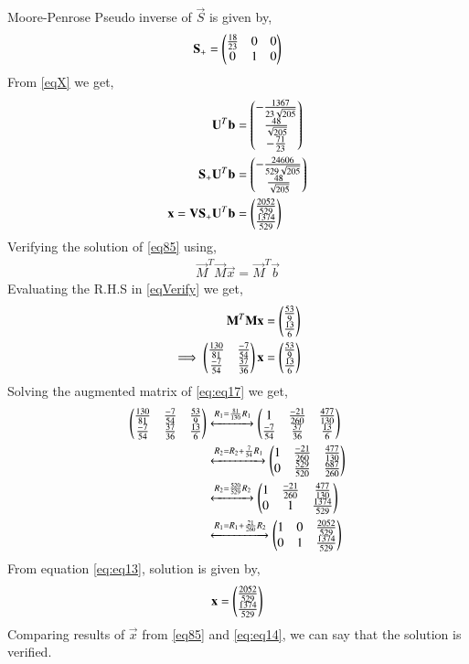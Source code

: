 \documentclass[journal,12pt,twocolumn]{IEEEtran}
\begin{document}
Moore-Penrose Pseudo inverse of $\vec{S}$ is given by,
\begin{align}
\mathbf{S_+} = \begin{pmatrix}\frac{18}{23}&0&0\\0&1&0\end{pmatrix}
\end{align}
From \eqref{eqX} we get,
\begin{align}
\mathbf{U}^T\mathbf{b}&=\begin{pmatrix}-\frac{1367}{23\sqrt{205}}\\\frac{48}{\sqrt{205}}\\-\frac{71}{23}\end{pmatrix}\\
\mathbf{S_+}\mathbf{U}^T\mathbf{b}&=\begin{pmatrix}-\frac{24606}{529\sqrt{205}}\\\frac{48}{\sqrt{205}}\end{pmatrix}\\
\mathbf{x} = \mathbf{V}\mathbf{S_+}\mathbf{U}^T\mathbf{b} &= \begin{pmatrix}\frac{2052}{529}\\\frac{1374}{529}\end{pmatrix}\label{eq85}
\end{align}
Verifying the solution of \eqref{eq85} using,
\begin{align}
\vec{M}^T\vec{M}\vec{x} = \vec{M}^T\vec{b}\label{eqVerify}
\end{align}
Evaluating the R.H.S in \eqref{eqVerify} we get,
\begin{align}
\mathbf{M}^T\mathbf{M}\mathbf{x} &= \begin{pmatrix}\frac{53}{9}\\\frac{13}{6}\end{pmatrix}\\
\implies\begin{pmatrix}\frac{130}{81}&\frac{-7}{54}\\\frac{-7}{54}&\frac{37}{36}\end{pmatrix}\mathbf{x} &= \begin{pmatrix}\frac{53}{9}\\\frac{13}{6}\end{pmatrix}\label{eq:eq17}
\end{align}
Solving the augmented matrix of \eqref{eq:eq17} we get,
\begin{align}
\begin{pmatrix}\frac{130}{81}&\frac{-7}{54}&\frac{53}{9}\\\frac{-7}{54}&\frac{37}{36}&\frac{13}{6}\end{pmatrix} &\xleftrightarrow{R_1=\frac{81}{130}R_1}\begin{pmatrix}1&\frac{-21}{260}&\frac{477}{130}\\\frac{-7}{54}&\frac{37}{36}&\frac{13}{6}\end{pmatrix}\\
&\xleftrightarrow{R_2=R_2+\frac{7}{54}R_1}\begin{pmatrix}1&\frac{-21}{260}&\frac{477}{130}\\0&\frac{529}{520}&\frac{687}{260}\end{pmatrix}\\
&\xleftrightarrow{R_2=\frac{520}{529}R_2}\begin{pmatrix}1&\frac{-21}{260}&\frac{477}{130}\\0&1&\frac{1374}{529}\end{pmatrix}\\
&\xleftrightarrow{R_1=R_1+\frac{21}{260}R_2}\begin{pmatrix}1&0&\frac{2052}{529}\\0&1&\frac{1374}{529}\end{pmatrix}\label{eq:eq13}
\end{align}
From equation \eqref{eq:eq13}, solution is given by,
\begin{align}\label{eq:eq14}
\mathbf{x}=\begin{pmatrix}\frac{2052}{529}\\\frac{1374}{529}\end{pmatrix}
\end{align}
Comparing results of $\vec{x}$ from \eqref{eq85} and \eqref{eq:eq14}, we can say that the solution is verified.
\end{document}
